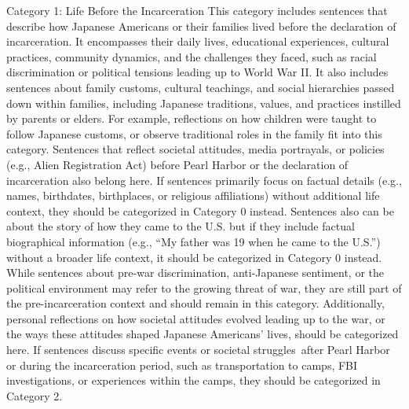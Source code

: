 Category 1: Life Before the Incarceration
This category includes sentences that describe how Japanese Americans or their families lived before the declaration of incarceration. It encompasses their daily lives, educational experiences, cultural practices, community dynamics, and the challenges they faced, such as racial discrimination or political tensions leading up to World War II. It also includes sentences about family customs, cultural teachings, and social hierarchies passed down within families, including Japanese traditions, values, and practices instilled by parents or elders. For example, reflections on how children were taught to follow Japanese customs, or observe traditional roles in the family fit into this category. Sentences that reflect societal attitudes, media portrayals, or policies (e.g., Alien Registration Act) before Pearl Harbor or the declaration of incarceration also belong here. If sentences primarily focus on factual details (e.g., names, birthdates, birthplaces, or religious affiliations) without additional life context, they should be categorized in Category 0 instead.
Sentences also can be about the story of how they came to the U.S. but if they include factual biographical information (e.g., “My father was 19 when he came to the U.S.”) without a broader life context, it should be categorized in Category 0 instead.
While sentences about pre-war discrimination, anti-Japanese sentiment, or the political environment may refer to the growing threat of war, they are still part of the pre-incarceration context and should remain in this category. Additionally, personal reflections on how societal attitudes evolved leading up to the war, or the ways these attitudes shaped Japanese Americans' lives, should be categorized here.
If sentences discuss specific events or societal struggles after Pearl Harbor or during the incarceration period, such as transportation to camps, FBI investigations, or experiences within the camps, they should be categorized in Category 2.

